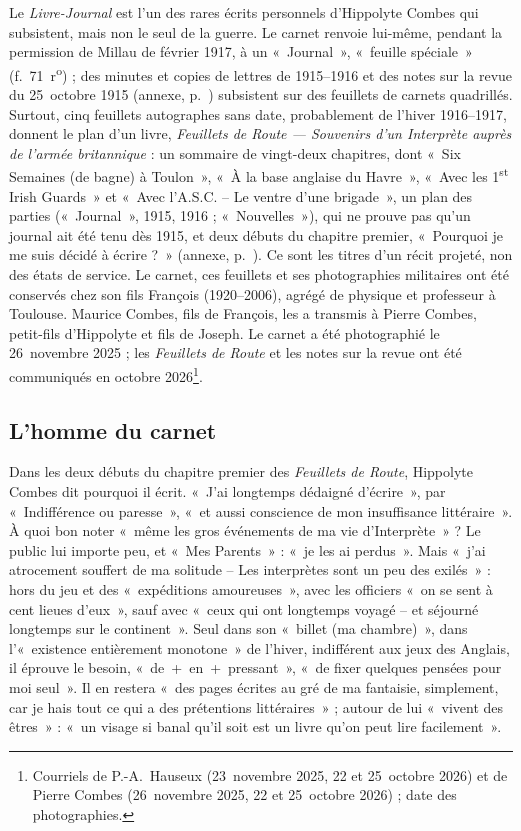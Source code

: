 Le \textit{Livre-Journal} est l'un des rares écrits personnels d'Hippolyte Combes qui subsistent, mais non le seul de la guerre. Le carnet renvoie lui-même, pendant la permission de Millau de février 1917, à un «~Journal~», «~feuille spéciale~» (f.~71~r\textsuperscript{o}) ; des minutes et copies de lettres de 1915--1916 et des notes sur la revue du 25~octobre 1915 (annexe, p.~\pageref{annexe:doc7}) subsistent sur des feuillets de carnets quadrillés. Surtout, cinq feuillets autographes sans date, probablement de l'hiver 1916--1917, donnent le plan d'un livre, \textit{Feuillets de Route — Souvenirs d'un Interprète auprès de l'armée britannique} : un sommaire de vingt-deux chapitres, dont «~Six Semaines (de bagne) à Toulon~», «~À la base anglaise du Havre~», «~Avec les 1\textsuperscript{st} Irish Guards~» et «~Avec l'A.S.C. – Le ventre d'une brigade~», un plan des parties («~Journal~», 1915, 1916 ; «~Nouvelles~»), qui ne prouve pas qu'un journal ait été tenu dès 1915, et deux débuts du chapitre premier, «~Pourquoi je me suis décidé à écrire ?~» (annexe, p.~\pageref{annexe:doc6}). Ce sont les titres d'un récit projeté, non des états de service. Le carnet, ces feuillets et ses photographies militaires ont été conservés chez son fils François (1920--2006), agrégé de physique et professeur à Toulouse. Maurice Combes, fils de François, les a transmis à Pierre Combes, petit-fils d'Hippolyte et fils de Joseph. Le carnet a été photographié le 26~novembre 2025 ; les \textit{Feuillets de Route} et les notes sur la revue ont été communiqués en octobre 2026\footnote{Courriels de P.-A.~Hauseux (23~novembre 2025, 22 et 25~octobre 2026) et de Pierre Combes (26~novembre 2025, 22 et 25~octobre 2026) ; date des photographies.}.

\subsection{L'homme du carnet}

Dans les deux débuts du chapitre premier des \textit{Feuillets de Route}, Hippolyte Combes dit pourquoi il écrit. «~J'ai longtemps dédaigné d'écrire~», par «~Indifférence ou paresse~», «~et aussi conscience de mon insuffisance littéraire~». À quoi bon noter «~même les gros événements de ma vie d'Interprète~» ? Le public lui importe peu, et «~Mes Parents~» : «~je les ai perdus~». Mais «~j'ai atrocement souffert de ma solitude – Les interprètes sont un peu des exilés~» : hors du jeu et des «~expéditions amoureuses~», avec les officiers «~on se sent à cent lieues d'eux~», sauf avec «~ceux qui ont longtemps voyagé – et séjourné longtemps sur le continent~». Seul dans son «~billet (ma chambre)~», dans l'«~existence entièrement monotone~» de l'hiver, indifférent aux jeux des Anglais, il éprouve le besoin, «~de~+~en~+~pressant~», «~de fixer quelques pensées pour moi seul~». Il en restera «~des pages écrites au gré de ma fantaisie, simplement, car je hais tout ce qui a des prétentions littéraires~» ; autour de lui «~vivent des êtres~» : «~un visage si banal qu'il soit est un livre qu'on peut lire facilement~».

